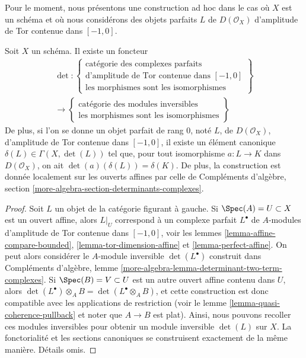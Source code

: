 \medskip\noindent
Pour le moment, nous présentons une construction ad hoc dans le cas
où $X$ est un schéma et où nous considérons des objets parfaits $L$ de
$D(\mathcal{O}_X)$ d'amplitude de Tor contenue dans $[-1, 0]$.

\begin{lemma}
\label{lemma-determinant-two-term-complexes}
Soit $X$ un schéma. Il existe un foncteur
$$
\begin{gathered}
\det :
\left\{
\begin{matrix}
\text{catégorie des complexes parfaits} \\
\text{d'amplitude de Tor contenue dans }[-1, 0] \\
\text{les morphismes sont les isomorphismes}
\end{matrix}
\right\}
\\
\longrightarrow
\left\{
\begin{matrix}
\text{catégorie des modules inversibles} \\
\text{les morphismes sont les isomorphismes}
\end{matrix}
\right\}
\end{gathered}
$$
De plus, si l'on se donne un objet parfait de rang $0$, noté $L$, de $D(\mathcal{O}_X)$,
d'amplitude de Tor contenue dans $[-1, 0]$, il existe un élément canonique
$\delta(L) \in \Gamma(X, \det(L))$ tel que, pour tout isomorphisme
$a : L \to K$ dans $D(\mathcal{O}_X)$, on ait $\det(a)(\delta(L)) = \delta(K)$.
De plus, la construction est donnée localement sur les ouverts affines par celle
de Compléments d'algèbre, section \ref{more-algebra-section-determinants-complexes}.
\end{lemma}

\begin{proof}
Soit $L$ un objet de la catégorie figurant à gauche. Si $\Spec(A) = U \subset X$
est un ouvert affine, alors $L|_U$ correspond à un complexe parfait $L^\bullet$
de $A$-modules d'amplitude de Tor contenue dans $[-1, 0]$, voir les
lemmes \ref{lemma-affine-compare-bounded},
\ref{lemma-tor-dimension-affine} et
\ref{lemma-perfect-affine}.
On peut alors considérer le $A$-module inversible $\det(L^\bullet)$ construit dans
Compléments d'algèbre, lemme \ref{more-algebra-lemma-determinant-two-term-complexes}.
Si $\Spec(B) = V \subset U$ est un autre ouvert affine contenu dans $U$,
alors $\det(L^\bullet) \otimes_A B = \det(L^\bullet \otimes_A B)$,
et cette construction est donc compatible avec les applications de restriction
(voir le lemme \ref{lemma-quasi-coherence-pullback} et noter que $A \to B$ est plat).
Ainsi, nous pouvons recoller ces modules inversibles pour obtenir un module inversible
$\det(L)$ sur $X$. La fonctorialité et les sections canoniques
se construisent exactement de la même manière. Détails omis.
\end{proof}

